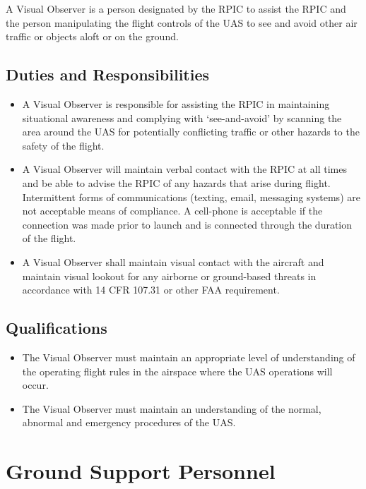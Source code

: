 \documentclass[
]{book}
\providecommand{\tightlist}{%
  \setlength{\itemsep}{0pt}\setlength{\parskip}{0pt}}
\begin{document}
A Visual Observer is a person designated by the RPIC to assist the RPIC and the person manipulating the flight controls of the UAS to see and avoid other air traffic or objects aloft or on the ground.

\subsection{Duties and Responsibilities}\label{duties-and-responsibilities-3}

\begin{itemize}
\tightlist
\item
  A Visual Observer is responsible for assisting the RPIC in maintaining situational awareness and complying with `see-and-avoid' by scanning the area around the UAS for potentially conflicting traffic or other hazards to the safety of the flight.
\item
  A Visual Observer will maintain verbal contact with the RPIC at all times and be able to advise the RPIC of any hazards that arise during flight. Intermittent forms of communications (texting, email, messaging systems) are not acceptable means of compliance. A cell-phone is acceptable if the connection was made prior to launch and is connected through the duration of the flight.
\item
  A Visual Observer shall maintain visual contact with the aircraft and maintain visual lookout for any airborne or ground-based threats in accordance with 14 CFR 107.31 or other FAA requirement.
\end{itemize}

\subsection{Qualifications}\label{qualifications-1}

\begin{itemize}
\tightlist
\item
  The Visual Observer must maintain an appropriate level of understanding of the operating flight rules in the airspace where the UAS operations will occur.
\item
  The Visual Observer must maintain an understanding of the normal, abnormal and emergency procedures of the UAS.
\end{itemize}

\section{Ground Support Personnel}\label{ground-support-personnel}
\end{document}
